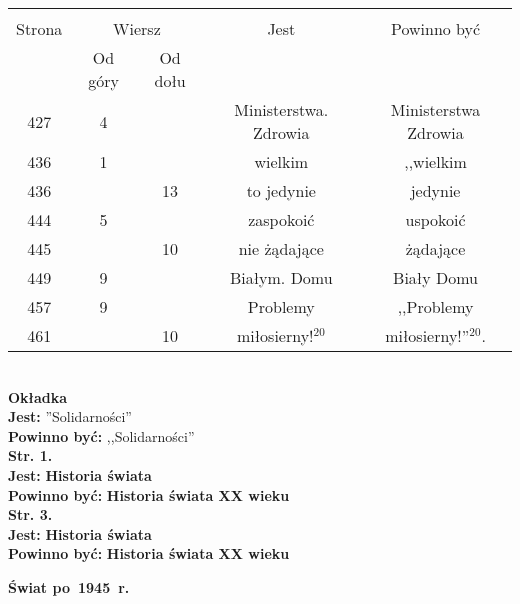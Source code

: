 \documentclass[a4paper,11pt]{article}  %
\newcommand{\spaceTwo}{2em}
\newcommand{\spaceThree}{1em}
\newcommand{\tb}{\textbf}
\newcommand{\noi}{\noindent}
\newcommand{\Str}[1]{\tb{Str. #1.}}
\newcommand{\Jest}{\tb{Jest: }}
\newcommand{\Pow}{\tb{Powinno być: }}
\newcommand{\Field}[1]{ \begin{center} {\Large \tb{#1} } \end{center} }
\begin{document}
\begin{center}
  \begin{tabular}{|c|c|c|c|c|}
    \hline
    & \multicolumn{2}{c|}{} & & \\
    Strona & \multicolumn{2}{c|}{Wiersz}& Jest & Powinno być \\ \cline{2-3}
    & Od góry & Od dołu & & \\ \hline
    427 &  4 & & Ministerstwa. Zdrowia & Ministerstwa Zdrowia \\
    436 &  1 & & wielkim & ,,wielkim %
    \\
    436 & & 13 & to jedynie & jedynie \\
    444 &  5 & & zaspokoić & uspokoić \\
    445 & & 10 & nie żądające & żądające \\
    449 &  9 & & Białym. Domu & Biały Domu \\
    457 &  9 & & Problemy & ,,Problemy %
    \\
    461 & & 10 & miłosierny!$^{ 20 }$ & miłosierny!''$^{ 20 }$. \\
    \hline
  \end{tabular}
\end{center}
\noi \\
\tb{Okładka} \\
\Jest ''Solidarności'' \\
\Pow  ,,Solidarności'' \\
\Str{1} \\
\Jest \tb{Historia świata} \\
\Pow  \tb{Historia świata XX wieku} \\
\Str{3} \\
\Jest \tb{Historia świata} \\
\Pow  \tb{Historia świata XX wieku} \\

\vspace{\spaceTwo}





\newpage
\Field{Świat po~1945~r.}

\vspace{\spaceTwo} \vspace{\spaceThree}
\end{document}
